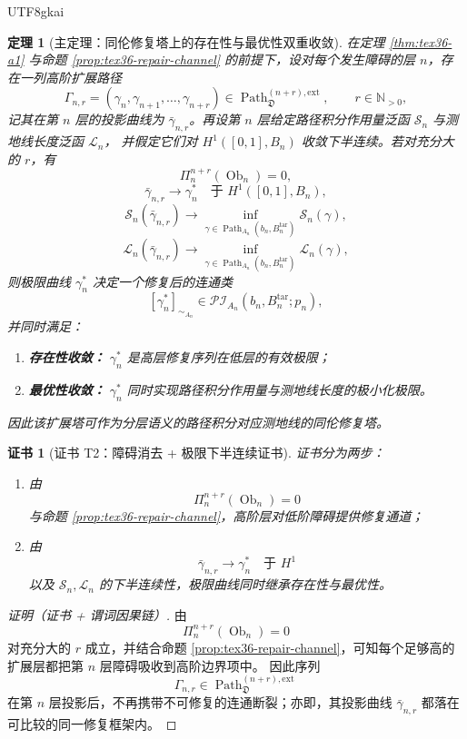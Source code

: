 \documentclass[12pt]{article}
\newtheorem{theorem}{定理}[section]
\newtheorem{Certificate}{证书}[section]
\newcommand{\NN}{\mathbb{N}}
\newcommand{\Path}{\operatorname{Path}}
\newcommand{\Ob}{\operatorname{Ob}}
\begin{document}
\begin{CJK*}{UTF8}{gkai}
\begin{theorem}[主定理：同伦修复塔上的存在性与最优性双重收敛]
\label{thm:tex36-double-convergence}
在定理 \ref{thm:tex36-a1} 与命题 \ref{prop:tex36-repair-channel} 的前提下，设对每个发生障碍的层 $n$，存在一列高阶扩展路径
\[
  \Gamma_{n,r}
  =
  (\gamma_n,\gamma_{n+1},\ldots,\gamma_{n+r})
  \in
  \Path_{\mathfrak D}^{(n+r),\mathrm{ext}},
  \qquad r\in\NN_{>0},
\]
记其在第 $n$ 层的投影曲线为 $\bar{\gamma}_{n,r}$。再设第 $n$ 层给定路径积分作用量泛函 $\mathcal S_n$ 与测地线长度泛函 $\mathcal L_n$，
并假定它们对 $H^1([0,1],B_n)$ 收敛下半连续。若对充分大的 $r$，有
\[
  \Pi_n^{n+r}(\Ob_n)=0,
\]
\[
  \bar{\gamma}_{n,r}\to \gamma_n^\ast
  \quad\text{于 } H^1([0,1],B_n),
\]
\[
  \mathcal S_n(\bar{\gamma}_{n,r})
  \to
  \inf_{\gamma\in \Path_{A_n}(b_n,B_n^{\mathrm{tar}})}\mathcal S_n(\gamma),
\]
\[
  \mathcal L_n(\bar{\gamma}_{n,r})
  \to
  \inf_{\gamma\in \Path_{A_n}(b_n,B_n^{\mathrm{tar}})}\mathcal L_n(\gamma),
\]
则极限曲线 $\gamma_n^\ast$ 决定一个修复后的连通类
\[
  [\gamma_n^\ast]_{\sim_{A_n}}
  \in
  \mathcal{PI}_{A_n}(b_n,B_n^{\mathrm{tar}};p_n),
\]
并同时满足：
\begin{enumerate}
  \item \textbf{存在性收敛：} $\gamma_n^\ast$ 是高层修复序列在低层的有效极限；
  \item \textbf{最优性收敛：} $\gamma_n^\ast$ 同时实现路径积分作用量与测地线长度的极小化极限。
\end{enumerate}
因此该扩展塔可作为分层语义的路径积分对应测地线的同伦修复塔。
\end{theorem}

\begin{Certificate}[证书 T2：障碍消去 + 极限下半连续证书]
\label{cert:tex36-t2}
证书分为两步：
\begin{enumerate}
  \item 由
  \[
    \Pi_n^{n+r}(\Ob_n)=0
  \]
  与命题 \ref{prop:tex36-repair-channel}，高阶层对低阶障碍提供修复通道；
  \item 由
  \[
    \bar{\gamma}_{n,r}\to \gamma_n^\ast
    \quad\text{于 } H^1
  \]
  以及 $\mathcal S_n,\mathcal L_n$ 的下半连续性，极限曲线同时继承存在性与最优性。
\end{enumerate}
\end{Certificate}

\begin{proof}[证明（证书 + 谓词因果链）]
由
\[
  \Pi_n^{n+r}(\Ob_n)=0
\]
对充分大的 $r$ 成立，并结合命题 \ref{prop:tex36-repair-channel}，可知每个足够高的扩展层都把第 $n$ 层障碍吸收到高阶边界项中。
因此序列
\[
  \Gamma_{n,r}\in \Path_{\mathfrak D}^{(n+r),\mathrm{ext}}
\]
在第 $n$ 层投影后，不再携带不可修复的连通断裂；亦即，其投影曲线 $\bar{\gamma}_{n,r}$ 都落在可比较的同一修复框架内。


\end{proof}
\end{CJK*}
\end{document}
